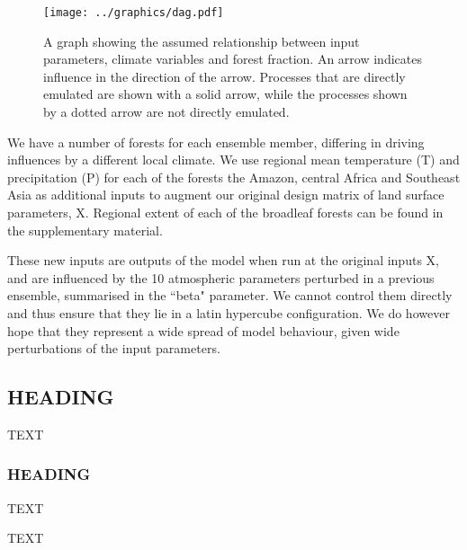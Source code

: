\documentclass[gmd, manuscript]{copernicus}
\begin{document}
\begin{figure}[t]
\texttt{[image: ../graphics/dag.pdf]}
\caption{A graph showing the assumed relationship between input parameters, climate variables and forest fraction. An arrow indicates influence in the direction of the arrow. Processes that are directly emulated are shown with a solid arrow, while the processes shown by a dotted arrow are not directly emulated. 
}
\label{fig:dag}
\end{figure}

We have a number of forests for each ensemble member, differing in driving influences by a different local climate. We use regional mean temperature (T) and precipitation (P) for each of the forests the Amazon, central Africa and Southeast Asia as additional inputs to augment our original design matrix of land surface parameters, X. Regional extent of each of the broadleaf forests can be found in the supplementary material.

These new inputs are outputs of the model when run at the original inputs X, and are influenced by the 10 atmospheric parameters perturbed in a previous ensemble, summarised in the ``beta" parameter. We cannot control them directly and thus ensure that they lie in a latin hypercube configuration. We do however hope that they represent a wide spread of model behaviour, given wide perturbations of the input parameters.



\subsection{HEADING}
TEXT


\subsubsection{HEADING}
TEXT


\conclusions  %
TEXT




\end{document}
